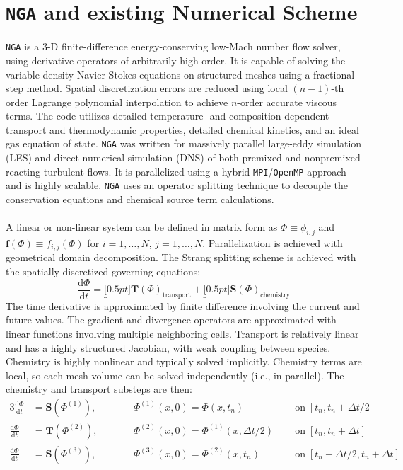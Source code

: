 \documentclass{homework}
\begin{document}
\section{\textbf{\texttt{NGA} and existing Numerical Scheme}}
\noindent \texttt{NGA} \cite{DESJARDINS2008,MACART2016} is a 3-D finite-difference energy-conserving low-Mach number flow solver, using derivative operators of arbitrarily high order. It is capable of solving the variable-density Navier-Stokes equations on structured meshes using a fractional-step method. Spatial discretization errors are reduced using local $(n-1)$-th order Lagrange polynomial interpolation to achieve $n$-order accurate viscous terms. The code utilizes detailed temperature- and composition-dependent transport and thermodynamic properties, detailed chemical kinetics, and an ideal gas equation of state. \texttt{NGA} was written for massively parallel large-eddy simulation (LES) and direct numerical simulation (DNS) of both premixed and nonpremixed reacting turbulent flows. It is parallelized using a hybrid \texttt{MPI}/\texttt{OpenMP} approach and is highly scalable. \texttt{NGA} uses an operator splitting technique to decouple the conservation equations and chemical source term calculations. 
\\ \\ \noindent
A linear or non-linear system can be defined in matrix form as $\Phi \equiv \phi_{i,j} $ and $\mathbf{f}(\Phi) \equiv f_{i,j} (\Phi)$ for $ i= 1, \dots, N $, $ j= 1, \dots, N $. Parallelization is achieved with geometrical domain decomposition. The Strang splitting scheme is achieved with the spatially discretized governing equations:
$$\frac{\textrm{d} \Phi}{\textrm{d} t} = \underbracket[0.5pt]{\mathbf{T}(\Phi)}_{\textrm{transport}} + \underbracket[0.5pt]{\mathbf{S}(\Phi)}_{\textrm{chemistry}} $$
The time derivative is approximated by finite difference involving
the current and future values. The gradient and divergence operators are approximated with linear functions involving multiple neighboring cells. Transport is relatively linear and has a highly structured Jacobian, with weak coupling between species. Chemistry is highly nonlinear and typically solved implicitly. Chemistry terms are local, so each mesh volume can be solved independently (i.e., in parallel). The chemistry and transport substeps are then:
\scriptsize
\begin{alignat*}{3}
    \frac{\textrm{d} \Phi}{\textrm{d} t} &= \mathbf{S}(\Phi^{(1)}), \qquad &&\Phi^{(1)}(x,0) = \Phi(x,t_n) \;\; & &\textrm{on} \; [t_n, t_n + \Delta t / 2] \\
    \frac{\textrm{d} \Phi}{\textrm{d} t} &= \mathbf{T}(\Phi^{(2)}), \qquad &&\Phi^{(2)}(x,0) = \Phi^{(1)}(x,\Delta t / 2) \;\; & &\textrm{on} \; [t_n, t_n + \Delta t] \\
    \frac{\textrm{d} \Phi}{\textrm{d} t} &= \mathbf{S}(\Phi^{(3)}), \qquad &&\Phi^{(3)}(x,0) = \Phi^{(2)}(x,t_n) \;\; & &\textrm{on} \; [t_n + \Delta t / 2, t_n + \Delta t]
\end{alignat*}
\end{document}
